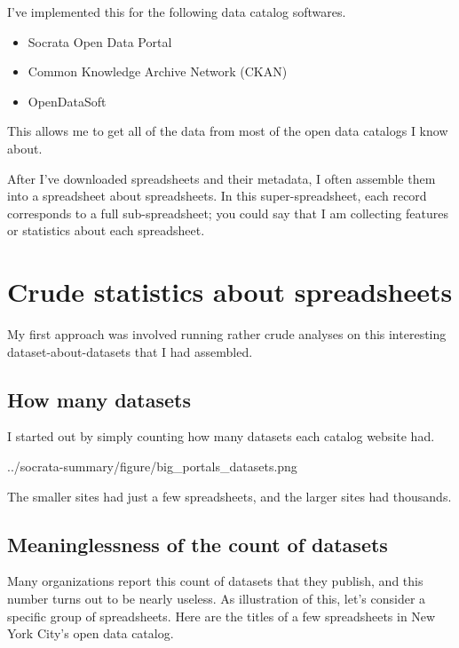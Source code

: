 \documentclass{acm_proc_article-sp}
\begin{document}
I've implemented this for the following data catalog softwares.

\begin{itemize}
\item Socrata Open Data Portal
\item Common Knowledge Archive Network (CKAN)
\item OpenDataSoft
\end{itemize}

This allows me to get all of the data from most of the open data catalogs I know about.

After I've downloaded spreadsheets and their metadata,
I often assemble them into a spreadsheet about spreadsheets. \cite{data-driven}
In this super-spreadsheet, each record corresponds to a full
sub-spreadsheet; you could say that I am collecting features or statistics
about each spreadsheet.

\section{Crude statistics about spreadsheets}
My first approach was involved running rather crude analyses on this
interesting dataset-about-datasets that I had assembled.

\subsection{How many datasets}
I started out by simply counting how many datasets each catalog website had.

{../socrata-summary/figure/big_portals_datasets.png}

The smaller sites had just a few spreadsheets, and the larger sites had thousands.

\subsection{Meaninglessness of the count of datasets} \label{colnames}
Many organizations report this count of datasets that they publish, and this number
turns out to be nearly useless. As illustration of this, let's consider a specific
group of spreadsheets. Here are the titles of a few spreadsheets in New York City's
open data catalog.
\end{document}
